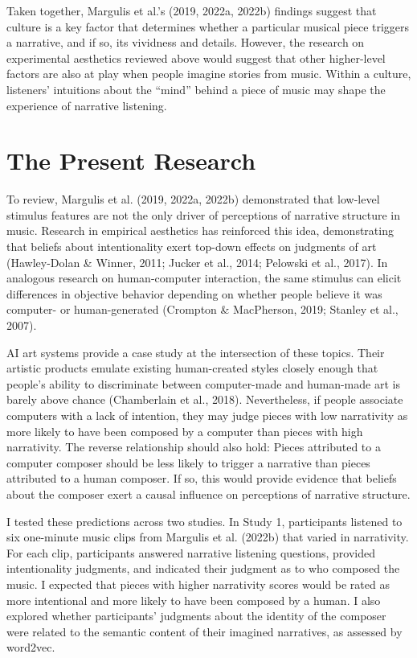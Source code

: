 \documentclass[12pt,twoside]{reedthesis}
\begin{document}
Taken together, Margulis et al.’s (2019, 2022a, 2022b) findings suggest that culture is a key factor that determines whether a particular musical piece triggers a narrative, and if so, its vividness and details. However, the research on experimental aesthetics reviewed above would suggest that other higher-level factors are also at play when people imagine stories from music. Within a culture, listeners’ intuitions about the “mind” behind a piece of music may shape the experience of narrative listening. 

\section*{The Present Research}

To review, Margulis et al. (2019, 2022a, 2022b) demonstrated that low-level stimulus features are not the only driver of perceptions of narrative structure in music. Research in empirical aesthetics has reinforced this idea, demonstrating that beliefs about intentionality exert top-down effects on judgments of art (Hawley-Dolan \& Winner, 2011; Jucker et al., 2014; Pelowski et al., 2017). In analogous research on human-computer interaction, the same stimulus can elicit differences in objective behavior depending on whether people believe it was computer- or human-generated (Crompton \& MacPherson, 2019; Stanley et al., 2007).

AI art systems provide a case study at the intersection of these topics. Their artistic products emulate existing human-created styles closely enough that people’s ability to discriminate between computer-made and human-made art is barely above chance (Chamberlain et al., 2018). Nevertheless, if people associate computers with a lack of intention, they may judge pieces with low narrativity as more likely to have been composed by a computer than pieces with high narrativity. The reverse relationship should also hold: Pieces attributed to a computer composer should be less likely to trigger a narrative than pieces attributed to a human composer. If so, this would provide evidence that beliefs about the composer exert a causal influence on perceptions of narrative structure.

I tested these predictions across two studies. In Study 1, participants listened to six one-minute music clips from Margulis et al. (2022b) that varied in narrativity. For each clip, participants answered narrative listening questions, provided intentionality judgments, and indicated their judgment as to who composed the music. I expected that pieces with higher narrativity scores would be rated as more intentional and more likely to have been composed by a human. I also explored whether participants’ judgments about the identity of the composer were related to the semantic content of their imagined narratives, as assessed by word2vec.
\end{document}
